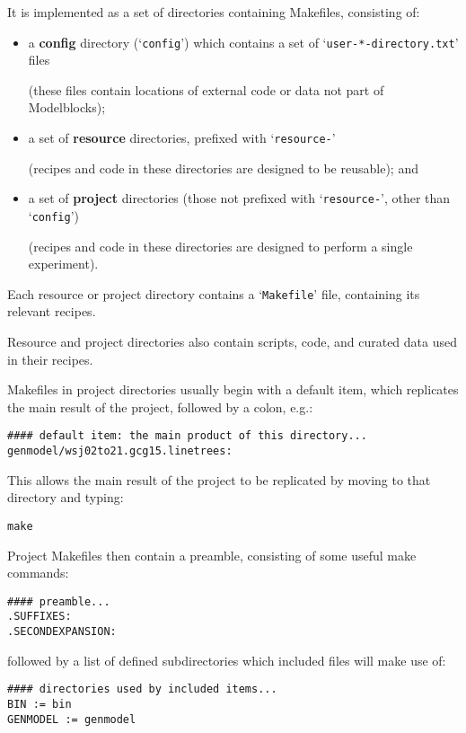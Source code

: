 \documentclass[12pt]{report}
\def\blue{\color{blue}}
\def\magenta{\color{magenta}}
\begin{document}
It is implemented as a set of directories containing Makefiles, consisting of:
%
\begin{itemize}

\item a {\bf config} directory (`{\blue\tt config}') which contains a set of `{\blue\tt user-*-directory.txt}' files

      (these files contain locations of external code or data not part of Modelblocks);

\item a set of {\bf resource} directories, prefixed with `{\blue\tt resource-}'

      (recipes and code in these directories are designed to be reusable); and

\item a set of {\bf project} directories (those not prefixed with `{\blue\tt resource-}', other than `{\blue\tt config}')

      (recipes and code in these directories are designed to perform a single experiment).

\end{itemize}

Each resource or project directory contains a `{\blue\tt Makefile}' file, containing its relevant recipes.

Resource and project directories also contain scripts, code, and curated data used in their recipes.

\bigskip

Makefiles in project directories usually begin with a default item, which replicates the main result of the project, followed by a colon, e.g.:
%
{\magenta\begin{verbatim}
#### default item: the main product of this directory...
genmodel/wsj02to21.gcg15.linetrees:
\end{verbatim}
}
%
This allows the main result of the project to be replicated by moving to that directory and typing:
%
{\blue\begin{verbatim}
make
\end{verbatim}
}

Project Makefiles then contain a preamble, consisting of some useful make commands:
%
{\magenta\begin{verbatim}
#### preamble...
.SUFFIXES:
.SECONDEXPANSION:
\end{verbatim}
}
%
followed by a list of defined subdirectories which included files will make use of:
%
{\magenta\begin{verbatim}
#### directories used by included items...
BIN := bin
GENMODEL := genmodel
\end{verbatim}
}
\end{document}
